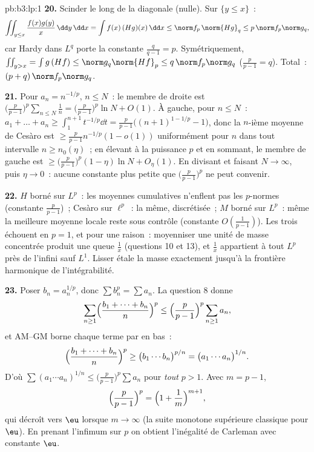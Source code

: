 \begin{solution}{pb:b3:lp:1}
\textbf{20.} Scinder le long de la diagonale (nulle). Sur
$\{y \leq x\}$~:
\[
\iint_{y\leq x}\frac{f(x)g(y)}{x}\,\dd y\,\dd x
= \int f(x)\,(Hg)(x)\,\dd x \leq \norm f_p\,\norm{Hg}_q
\leq p\,\norm f_p\norm g_q,
\]
car Hardy dans $L^q$ porte la constante $\frac q{q-1} =
p$. Symétriquement, $\iint_{y>x} = \int g\,(Hf) \leq
\norm g_q\norm{Hf}_p \leq q\,\norm f_p\norm g_q$ ($\frac
p{p-1} = q$). Total~: $(p + q)\,\norm f_p\norm g_q$.

\textbf{21.} Pour $a_n = n^{-1/p}$, $n \leq N$~: le membre
de droite est $\bigl(\frac p{p-1}\bigr)^p\sum_{n\leq
N}\frac1n = \bigl(\frac p{p-1}\bigr)^p\ln N + O(1)$. À
gauche, pour $n \leq N$~: $a_1 + \dots + a_n \geq
\int_1^{n+1}t^{-1/p}\dd t =
\frac{p}{p-1}\bigl((n+1)^{1-1/p} - 1\bigr)$, donc la
$n$-ième moyenne de Cesàro est $\geq \frac
p{p-1}n^{-1/p}(1 - o(1))$ uniformément pour $n$ dans tout
intervalle $n \geq n_0(\eta)$~; en élevant à la puissance
$p$ et en sommant, le membre de gauche est $\geq
\bigl(\frac p{p-1}\bigr)^p(1 - \eta)\ln N + O_\eta(1)$. En
divisant et faisant $N \to \infty$, puis $\eta \to 0$~:
aucune constante plus petite que $\bigl(\frac
p{p-1}\bigr)^p$ ne peut convenir.

\textbf{22.} $H$ borné sur $L^p$~: les moyennes cumulatives
n'enflent pas les $p$-normes (constante $\frac p{p-1}$)~;
Cesàro sur $\ell^p$~: la même, discrétisée~; $M$ borné sur
$L^p$~: même la meilleure moyenne locale reste sous
contrôle (constante $O(\frac1{p-1})$). Les trois échouent
en $p = 1$, et pour une raison~: moyenniser une unité de
masse concentrée produit une queue $\frac1x$ (questions
10 et 13), et $\frac1x$ appartient à tout $L^p$ près de
l'infini sauf $L^1$. Lisser étale la masse exactement
jusqu'à la frontière harmonique de l'intégrabilité.

\textbf{23.} Poser $b_n = a_n^{1/p}$, donc $\sum b_n^p =
\sum a_n$. La question 8 donne
\[
\sum_{n\geq1}\Bigl(\frac{b_1 + \dots + b_n}n\Bigr)^{p}
\leq \Bigl(\frac p{p-1}\Bigr)^{p}\sum_{n\geq1}a_n,
\]
et AM--GM borne chaque terme par en bas~:
\[
\Bigl(\frac{b_1 + \dots + b_n}n\Bigr)^{p}
\geq \bigl(b_1\cdots b_n\bigr)^{p/n}
= \bigl(a_1\cdots a_n\bigr)^{1/n}.
\]
D'où $\sum(a_1\cdots a_n)^{1/n} \leq \bigl(\frac
p{p-1}\bigr)^p\sum a_n$ pour \emph{tout} $p > 1$. Avec $m
= p - 1$,
\[
\Bigl(\frac p{p-1}\Bigr)^{p} =
\Bigl(1 + \frac1m\Bigr)^{m+1},
\]
qui décroît vers $\eu$ lorsque $m \to \infty$ (la suite
monotone supérieure classique pour $\eu$). En prenant
l'infimum sur $p$ on obtient l'inégalité de Carleman avec
constante $\eu$.


\end{solution}
